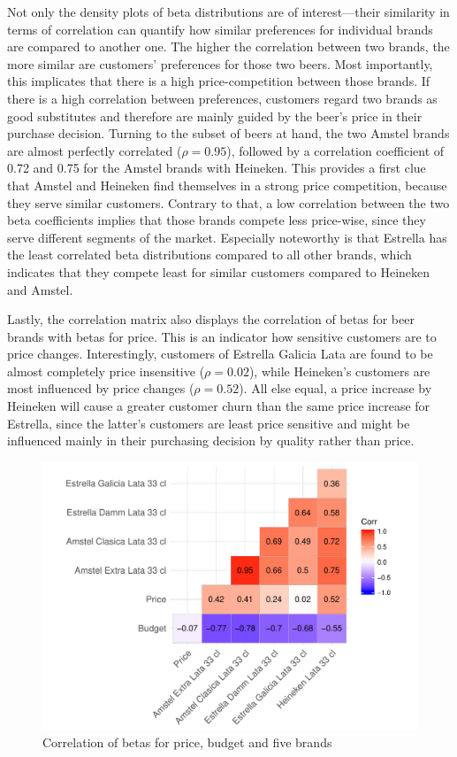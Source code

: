 \documentclass[12pt,a4paper]{article}
\begin{document}
Not only the density plots of beta distributions are of interest---their similarity in terms of correlation can quantify how similar preferences for individual brands are compared to another one.
The higher the correlation between two brands, the more similar are customers' preferences for those two beers.
Most importantly, this implicates that there is a high price-competition between those brands.
If there is a high correlation between preferences, customers regard two brands as good substitutes and therefore are mainly guided by the beer's price in their purchase decision.
Turning to the subset of beers at hand, the two Amstel brands are almost perfectly correlated ($\rho=0.95$), followed by a correlation coefficient of 0.72 and 0.75 for the Amstel brands with Heineken.
This provides a first clue that Amstel and Heineken find themselves in a strong price competition, because they serve similar customers.
Contrary to that, a low correlation between the two beta coefficients implies that those brands compete less price-wise, since they serve different segments of the market.
Especially noteworthy is that Estrella has the least correlated beta distributions compared to all other brands, which indicates that they compete least for similar customers compared to Heineken and Amstel.

Lastly, the correlation matrix also displays the correlation of betas for beer brands with betas for price.
This is an indicator how sensitive customers are to price changes.
Interestingly, customers of Estrella Galicia Lata are found to be almost completely price insensitive ($\rho=0.02$), while Heineken's customers are most influenced by price changes ($\rho=0.52$).
All else equal, a price increase by Heineken will cause a greater customer churn than the same price increase for Estrella, since the latter's customers are least price sensitive and might be influenced mainly in their purchasing decision by quality rather than price.

\begin{figure}[ht]
	\centering
  \includegraphics[scale = 0.7]{figures/corrplot_betas_five.pdf}
	\caption{Correlation of betas for price, budget and five brands}
	\label{fig_corr_five}
\end{figure}
\end{document}
